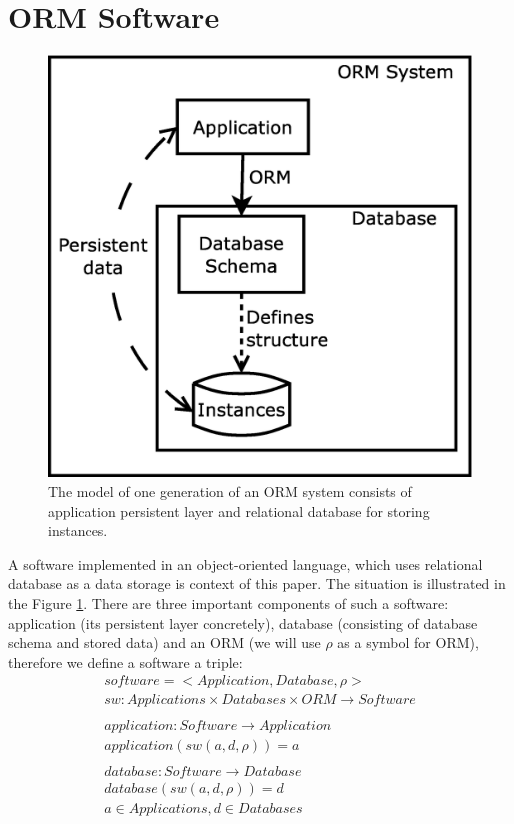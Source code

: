 \documentclass[11pt]{article}
\begin{document}
\section{ORM Software}
\label{sec:evoIntro}
\begin{figure}
\centering
	\includegraphics[scale=0.3]{./images/system}
	\caption{The model of one generation of an ORM system consists of application persistent layer and relational database for storing instances.}
\label{fig:appStructure}
\end{figure}
A software implemented in an object-oriented language, which uses relational database as a data storage is context of this paper. The situation is illustrated in the Figure \ref{fig:appStructure}. There are three important components of such a software: application (its persistent layer concretely), database (consisting of database schema and stored data) and an ORM (we will use $\rho$ as a symbol for ORM), therefore we define a software a triple:
\begin{align*}
	software = < Application, Database, \rho > \\
	sw : Applications \times Databases \times ORM \rightarrow Software \\ \\
	application : Software \rightarrow Application \\
	application(sw(a, d, \rho)) = a \\ \\
	database : Software \rightarrow Database \\
	database(sw(a, d, \rho)) = d \\
	a \in Applications, d \in Databases
\end{align*}
\end{document}
